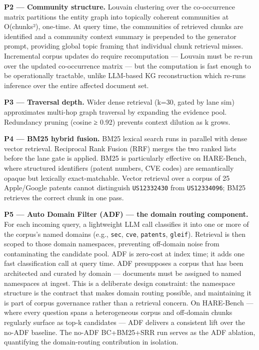 \documentclass[
]{article}
\begin{document}
\textbf{P2 --- Community structure.} Louvain clustering over the
co-occurrence matrix partitions the entity graph into topically coherent
communities at O(chunks²), one-time. At query time, the communities of
retrieved chunks are identified and a community context summary is
prepended to the generator prompt, providing global topic framing that
individual chunk retrieval misses. Incremental corpus updates do require
recomputation --- Louvain must be re-run over the updated co-occurrence
matrix --- but the computation is fast enough to be operationally
tractable, unlike LLM-based KG reconstruction which re-runs inference
over the entire affected document set.

\textbf{P3 --- Traversal depth.} Wider dense retrieval (k=30, gated by
lane sim) approximates multi-hop graph traversal by expanding the
evidence pool. Redundancy pruning (cosine ≥ 0.92) prevents context
dilution as k grows.

\textbf{P4 --- BM25 hybrid fusion.} BM25 lexical search runs in parallel
with dense vector retrieval. Reciprocal Rank Fusion (RRF) merges the two
ranked lists before the lane gate is applied. BM25 is particularly
effective on HARE-Bench, where structured identifiers (patent numbers,
CVE codes) are semantically opaque but lexically exact-matchable. Vector
retrieval over a corpus of 25 Apple/Google patents cannot distinguish
\texttt{US12332430} from \texttt{US12334096}; BM25 retrieves the correct
chunk in one pass.

\textbf{P5 --- Auto Domain Filter (ADF) --- the domain routing
component.} For each incoming query, a lightweight LLM call classifies
it into one or more of the corpus's named domains (e.g., \texttt{sec},
\texttt{cve}, \texttt{patents}, \texttt{gleif}). Retrieval is then
scoped to those domain namespaces, preventing off-domain noise from
contaminating the candidate pool. ADF is zero-cost at index time; it
adds one fast classification call at query time. ADF presupposes a
corpus that has been architected and curated by domain --- documents
must be assigned to named namespaces at ingest. This is a deliberate
design constraint: the namespace structure is the contract that makes
domain routing possible, and maintaining it is part of corpus governance
rather than a retrieval concern. On HARE-Bench --- where every question
spans a heterogeneous corpus and off-domain chunks regularly surface as
top-k candidates --- ADF delivers a consistent lift over the no-ADF
baseline. The no-ADF BC+BM25+SRR run serves as the ADF ablation,
quantifying the domain-routing contribution in isolation.
\end{document}
